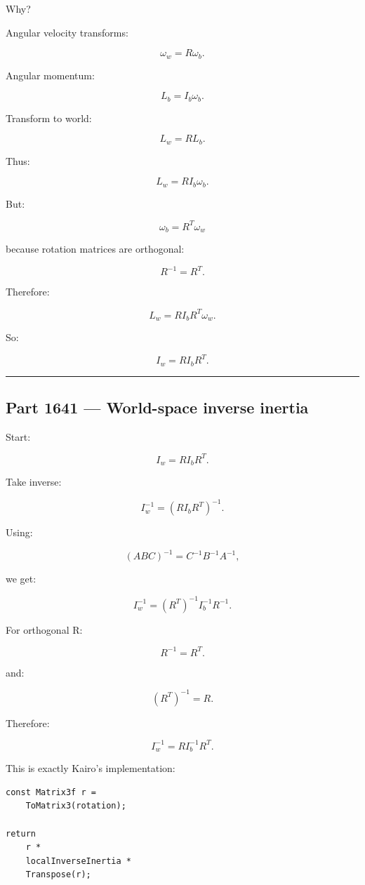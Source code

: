 Why?

Angular velocity transforms:

\[
\omega_w=
R\omega_b.
\]

Angular momentum:

\[
L_b=
I_b\omega_b.
\]

Transform to world:

\[
L_w=
RL_b.
\]

Thus:

\[
L_w=
RI_b\omega_b.
\]

But:

\[
\omega_b=
R^T\omega_w
\]

because rotation matrices are orthogonal:

\[
R^{-1}=R^T.
\]

Therefore:

\[
L_w=
RI_bR^T\omega_w.
\]

So:

\[
I_w=
RI_bR^T.
\]

\begin{center}\rule{0.5\linewidth}{0.5pt}\end{center}

\subsection{Part 1641 --- World-space inverse inertia}\label{06-engine-ii-ch035-part-1641-world-space-inverse-inertia}

\hypertarget{06-engine-ii-ch035-part-1641-world-space-inverse-inertia}{}

Start:

\[
I_w
=
RI_bR^T.
\]

Take inverse:

\[
I_w^{-1}
=
(RI_bR^T)^{-1}.
\]

Using:

\[
(ABC)^{-1}
=
C^{-1}B^{-1}A^{-1},
\]

we get:

\[
I_w^{-1}
=
(R^T)^{-1}
I_b^{-1}
R^{-1}.
\]

For orthogonal R:

\[
R^{-1}=R^T.
\]

and:

\[
(R^T)^{-1}=R.
\]

Therefore:

\[
\boxed{
I_w^{-1}
=
R
I_b^{-1}
R^T.
}
\]

This is exactly Kairo's implementation:

\begin{verbatim}
const Matrix3f r =
    ToMatrix3(rotation);

return
    r *
    localInverseInertia *
    Transpose(r);
\end{verbatim}


